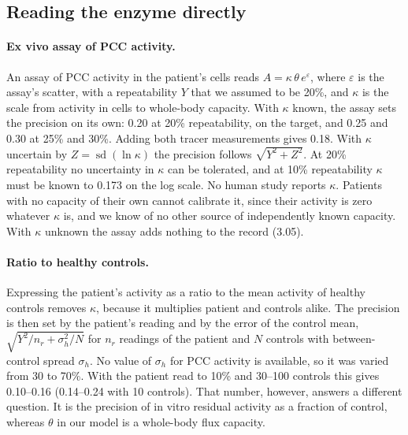 \subsection{Reading the enzyme directly}
\label{si:s4:direct}

\paragraph{Ex vivo assay of PCC activity.} An assay of PCC activity in the patient's cells
reads $A=\kappa\,\theta\,e^{\varepsilon}$, where $\varepsilon$ is the assay's scatter, with a
repeatability $Y$ that we assumed to be 20\%, and $\kappa$ is the scale from activity in cells
to whole-body capacity. With $\kappa$ known, the assay sets the precision on its own: 0.20 at
20\% repeatability, on the target, and 0.25 and 0.30 at 25\% and 30\%. Adding both tracer
measurements gives 0.18. With $\kappa$ uncertain by $Z=\operatorname{sd}(\ln\kappa)$ the
precision follows $\sqrt{Y^2+Z^2}$. At 20\% repeatability no uncertainty in $\kappa$ can be
tolerated, and at 10\% repeatability $\kappa$ must be known to 0.173 on the log scale. No human
study reports $\kappa$. Patients with no capacity of their own cannot calibrate it, since their
activity is zero whatever $\kappa$ is, and we know of no other source of independently known
capacity. With $\kappa$ unknown the assay adds nothing to the record (3.05).

\paragraph{Ratio to healthy controls.} Expressing the patient's activity as a ratio to the mean
activity of healthy controls removes $\kappa$, because it multiplies patient and controls alike.
The precision is then set by the patient's reading and by the error of the control mean,
$\sqrt{Y^2/n_r+\sigma_h^2/N}$ for $n_r$ readings of the patient and $N$ controls with
between-control spread $\sigma_h$. No value of $\sigma_h$ for PCC activity is available, so it
was varied from 30 to 70\%. With the patient read to 10\% and 30--100 controls this gives
0.10--0.16 (0.14--0.24 with 10 controls). That number, however, answers a different question.
It is the precision of in vitro residual activity as a fraction of control, whereas $\theta$ in our model is a whole-body flux
capacity.


